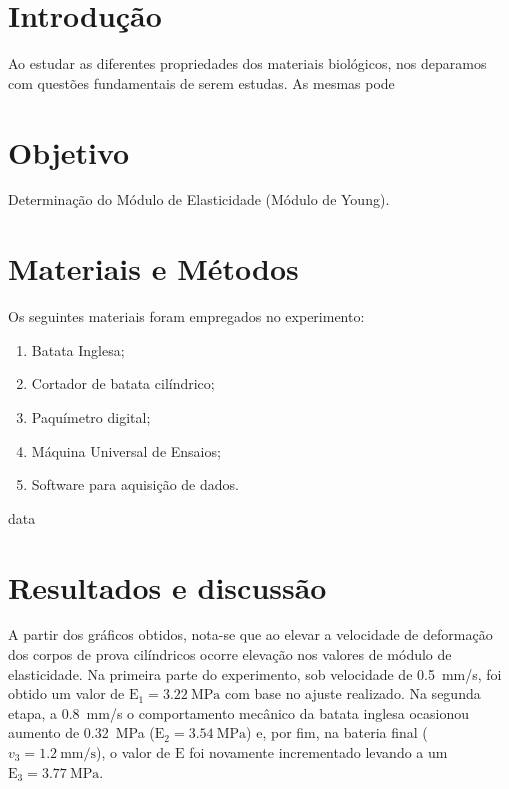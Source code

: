 \documentclass[a4paper, 12pt]{article}
\begin{document}
	\section{Introdução}
	
	Ao estudar as diferentes propriedades dos materiais biológicos, nos deparamos com questões fundamentais de serem estudas. As mesmas pode
	
	\section{Objetivo}
	
	Determinação do Módulo de Elasticidade (Módulo de Young).
	
	\section{Materiais e Métodos}
	
	Os seguintes materiais foram empregados no experimento:
	
	\begin{enumerate}
		\item Batata Inglesa;
		\item Cortador de batata cilíndrico;
		\item Paquímetro digital;
		\item Máquina Universal de Ensaios;
		\item Software para aquisição de dados.
	\end{enumerate}
	
	{data}
	
	\section{Resultados e discussão}
	
	A partir dos gráficos obtidos, nota-se que ao elevar a velocidade de deformação dos corpos de prova cilíndricos ocorre elevação nos valores de módulo de elasticidade. Na primeira parte do experimento, sob velocidade de \SI{.5}{\milli\meter/\second}, foi obtido um valor de $\textrm{E}_{1}=\SI{3.22}{\mega\pascal}$ com base no ajuste realizado. Na segunda etapa, a \SI{.8}{\milli\meter/\second} o comportamento mecânico da batata inglesa ocasionou aumento de \SI{.32}{\mega\pascal} ($\textrm{E}_{2}=\SI{3.54}{\mega\pascal}$) e, por fim, na bateria final ($v_{3}=\SI{1.2}{\milli\meter/\second}$), o valor de $\textrm{E}$ foi novamente incrementado levando a um $\textrm{E}_{3}=\SI{3.77}{\mega\pascal}$. 
	
\end{document}
